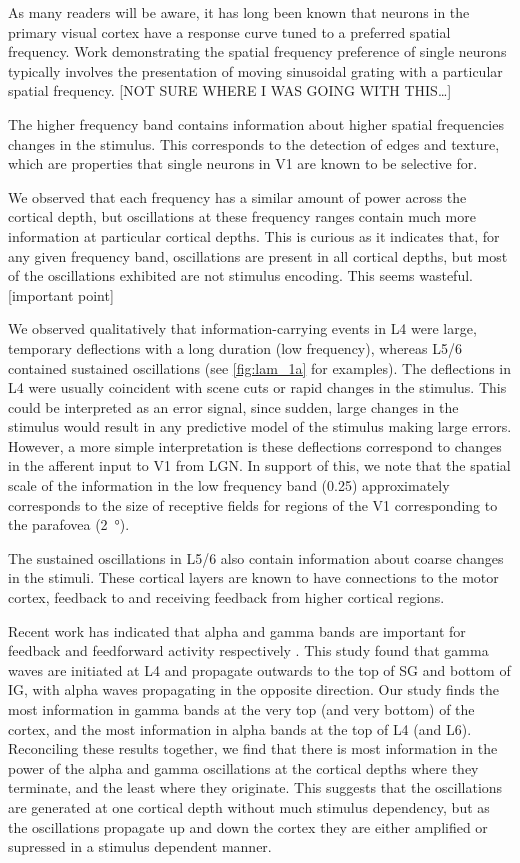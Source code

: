 As many readers will be aware, it has long been known that neurons in the primary visual cortex have a response curve tuned to a preferred spatial frequency.
Work demonstrating the spatial frequency preference of single neurons typically involves the presentation of moving sinusoidal grating with a particular spatial frequency.
[NOT SURE WHERE I WAS GOING WITH THIS{\dots}]

The higher frequency band contains information about higher spatial frequencies changes in the stimulus.
This corresponds to the detection of edges and texture, which are properties that single neurons in \ac{V1} are known to be selective for.


We observed that each frequency has a similar amount of power across the cortical depth, but oscillations at these frequency ranges contain much more information at particular cortical depths.
This is curious as it indicates that, for any given frequency band, oscillations are present in all cortical depths, but most of the oscillations exhibited are not stimulus encoding.
This seems wasteful.
[important point]

We observed qualitatively that information-carrying events in \ac{L4} were large, temporary deflections with a long duration (low frequency), whereas \acs{L5/6} contained sustained oscillations (see \autoref{fig:lam_1a} for examples).
The deflections in \ac{L4} were usually coincident with scene cuts or rapid changes in the stimulus.
This could be interpreted as an error signal, since sudden, large changes in the stimulus would result in any predictive model of the stimulus making large errors.
However, a more simple interpretation is these deflections correspond to changes in the afferent input to \ac{V1} from \ac{LGN}.
In support of this, we note that the spatial scale of the information in the low frequency band (\SI{0.25}{\cpd}) approximately corresponds to the size of receptive fields for regions of the \ac{V1} corresponding to the parafovea (\SI{2}{\degree}).

The sustained oscillations in \acs{L5/6} also contain information about coarse changes in the stimuli.
These cortical layers are known to have connections to the motor cortex, feedback to  and receiving feedback from higher cortical regions.


Recent work has indicated that alpha and gamma bands are important for feedback and feedforward activity respectively \citep{VanKerkoerle2014}.
This study \citep{VanKerkoerle2014} found that gamma waves are initiated at \ac{L4} and propagate outwards to the top of \ac{SG} and bottom of \ac{IG}, with alpha waves propagating in the opposite direction.
Our study finds the most information in gamma bands at the very top (and very bottom) of the cortex, and the most information in alpha bands at the top of \ac{L4} (and \ac{L6}).
Reconciling these results together, we find that there is most information in the power of the alpha and gamma oscillations at the cortical depths where they terminate, and the least where they originate.
This suggests that the oscillations are generated at one cortical depth without much stimulus dependency, but as the oscillations propagate up and down the cortex they are either amplified or supressed in a stimulus dependent manner.

